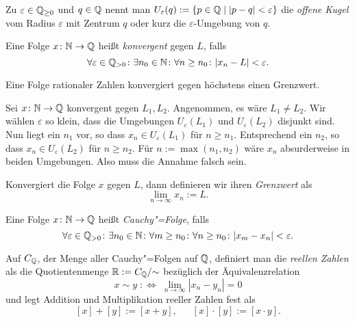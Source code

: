 \begin{Definition}\newlinefirst
Zu $\varepsilon\in\mathbb Q_{\ge 0}$ und $q\in\mathbb Q$ nennt man
$U_\varepsilon(q):=\{p\in\mathbb Q\mid |p-q|<\varepsilon\}$
die \emph{offene Kugel} vom Radius $\varepsilon$ mit Zentrum $q$ oder
kurz die $\varepsilon$-Umgebung von $q$.
\end{Definition}

\begin{Definition}\newlinefirst
Eine Folge $x\colon\mathbb N\to\mathbb Q$ heißt \emph{konvergent} gegen $L$, falls
\[\forall\varepsilon\in\mathbb Q_{>0}\colon\exists n_0\in\mathbb N\colon\forall n\ge n_0\colon |x_n-L| < \varepsilon.\]
\end{Definition}

\begin{Satz}
Eine Folge rationaler Zahlen konvergiert gegen höchstens einen Grenzwert.
\end{Satz}
\begin{Beweis}
Sei $x\colon\mathbb N\to\mathbb Q$ konvergent gegen $L_1,L_2$. Angenommen, es wäre $L_1\ne L_2$.
Wir wählen $\varepsilon$ so klein, dass die Umgebungen $U_\varepsilon(L_1)$
und $U_\varepsilon(L_2)$ disjunkt sind. Nun liegt ein $n_1$ vor,
so dass $x_n\in U_\varepsilon(L_1)$ für $n\ge n_1$. Entsprechend ein
$n_2$, so dass $x_n\in U_\varepsilon(L_2)$ für $n\ge n_2$. Für
$n:=\max(n_1,n_2)$ wäre $x_n$ absurderweise in beiden Umgebungen.
Also muss die Annahme falsch sein.\,\qedsymbol
\end{Beweis}

\begin{Definition}[Grenzwert]\newlinefirst
Konvergiert die Folge $x$ gegen $L$, dann definieren wir ihren \emph{Grenzwert} als
\[\lim_{n\to\infty} x_n := L.\]
\end{Definition}

\begin{Definition}\newlinefirst
Eine Folge $x\colon\mathbb N\to\mathbb Q$ heißt \emph{Cauchy"=Folge}, falls
\[\forall\varepsilon\in\mathbb Q_{>0}\colon\exists n_0\in\mathbb N\colon
\forall m\ge n_0\colon\forall n\ge n_0\colon |x_m - x_n| < \varepsilon.\]
\end{Definition}

\begin{Definition}\newlinefirst
Auf $C_\mathbb Q$, der Menge aller Cauchy"=Folgen auf $\mathbb Q$, definiert man
die \emph{reellen Zahlen} als die Quotientenmenge $\mathbb R:=C_\mathbb Q/{\sim}$
bezüglich der Äquivalenzrelation
\[x\sim y \;:\Leftrightarrow\; \lim_{n\to\infty}|x_n-y_n| = 0\]
und legt Addition und Multiplikation reeller Zahlen fest als
\[[x]+[y] := [x+y],\quad\;\; [x]\cdot [y] := [x\cdot y].\]
\end{Definition}
